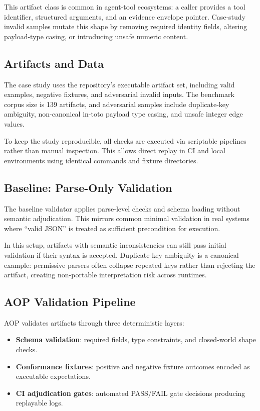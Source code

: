 This artifact class is common in agent-tool ecosystems: a caller provides a
tool identifier, structured arguments, and an evidence envelope pointer.
Case-study invalid samples mutate this shape by removing required identity
fields, altering payload-type casing, or introducing unsafe numeric content.

\subsection{Artifacts and Data}

The case study uses the repository's executable artifact set, including
valid examples, negative fixtures, and adversarial invalid inputs.
The benchmark corpus size is 139 artifacts, and adversarial samples include
duplicate-key ambiguity, non-canonical in-toto payload type casing, and
unsafe integer edge values.

To keep the study reproducible, all checks are executed via scriptable
pipelines rather than manual inspection. This allows direct replay in CI
and local environments using identical commands and fixture directories.

\subsection{Baseline: Parse-Only Validation}

The baseline validator applies parse-level checks and schema loading without
semantic adjudication. This mirrors common minimal validation in real systems
where ``valid JSON'' is treated as sufficient precondition for execution.

In this setup, artifacts with semantic inconsistencies can still pass initial
validation if their syntax is accepted. Duplicate-key ambiguity is a canonical
example: permissive parsers often collapse repeated keys rather than rejecting
the artifact, creating non-portable interpretation risk across runtimes.

\subsection{AOP Validation Pipeline}

AOP validates artifacts through three deterministic layers:
\begin{itemize}
\item \textbf{Schema validation}: required fields, type constraints,
      and closed-world shape checks.
\item \textbf{Conformance fixtures}: positive and negative fixture outcomes
      encoded as executable expectations.
\item \textbf{CI adjudication gates}: automated PASS/FAIL gate decisions
      producing replayable logs.
\end{itemize}

